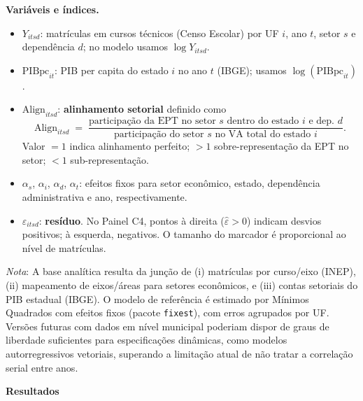\textbf{Variáveis e índices.}
\begin{itemize}
	\item $Y_{itsd}$: matrículas em cursos técnicos (Censo Escolar) por UF $i$, ano $t$, setor $s$ e dependência $d$; no modelo usamos $\log Y_{itsd}$.
	\item $\text{PIBpc}_{it}$: PIB per capita do estado $i$ no ano $t$ (IBGE); usamos $\log(\text{PIBpc}_{it})$.
	\item $\text{Align}_{itsd}$: \textbf{alinhamento setorial} definido como
	\[
	\text{Align}_{itsd}
	\;=\;
	\frac{\text{participação da EPT no setor } s \text{ dentro do estado } i \text{ e dep. } d}
	{\text{participação do setor } s \text{ no VA total do estado } i}.
	\]
	Valor $=1$ indica alinhamento perfeito; $>1$ sobre-representação da EPT no setor; $<1$ sub-representação.
	\item $\alpha_s$, $\alpha_i$, $\alpha_d$, $\alpha_t$: efeitos fixos para setor econômico, estado, dependência administrativa e ano, respectivamente.
	\item $\varepsilon_{itsd}$: \textbf{resíduo}. No Painel C4, pontos à direita ($\hat\varepsilon>0$) indicam desvios positivos; à esquerda, negativos. O tamanho do marcador é proporcional ao nível de matrículas.
\end{itemize}

\noindent
\textit{Nota}: A base analítica resulta da junção de (i) matrículas por curso/eixo (INEP), (ii) mapeamento de eixos/áreas para setores econômicos, e (iii) contas setoriais do PIB estadual (IBGE). O modelo de referência é estimado por Mínimos Quadrados com efeitos fixos (pacote \texttt{fixest}), com erros agrupados por UF. Versões futuras com dados em nível municipal poderiam dispor de graus de liberdade suficientes para especificações dinâmicas, como modelos autorregressivos vetoriais, superando a limitação atual de não tratar a correlação serial entre anos.

\textbf{Resultados}

